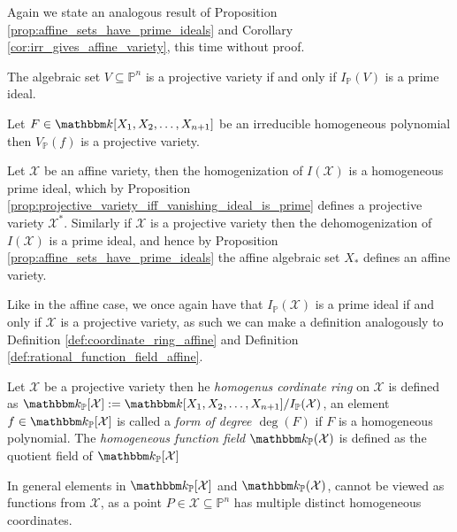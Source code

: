 Again we state an analogous result of Proposition \ref{prop:affine_sets_have_prime_ideals} and Corollary \ref{cor:irr_gives_affine_variety}, this time without proof.
\begin{proposition}\label{prop:projective_variety_iff_vanishing_ideal_is_prime}
The algebraic set $V \subseteq \mathbb{P}^{n}$ is a projective variety if and only if $I_{\mathbb{P}}(V)$ is a prime ideal.
\end{proposition}
\begin{corollary}\label{cor:irr_gives_projective_variety}
  Let $F \in \K[X_1, X_2, \ldots, X_{n + 1}]$ be an irreducible homogeneous polynomial then $V_{\mathbb{P}}(f)$ is a projective variety.
\end{corollary}


Let $\mathcal{X}$ be an affine variety, then the homogenization of $I(\mathcal{X})$ is a homogeneous prime ideal, which by Proposition \ref{prop:projective_variety_iff_vanishing_ideal_is_prime} defines a projective variety $\mathcal{X}^{*}$. Similarly if $\mathcal{X}$ is a projective variety then the dehomogenization of $I(\mathcal{X})$ is a prime ideal, and hence by Proposition \ref{prop:affine_sets_have_prime_ideals} the affine algebraic set $X_{*}$ defines an affine variety.

Like in the affine case, we once again have that $I_{\mathbb{P}}(\mathcal{X})$ is a prime ideal if and only if $\mathcal{X}$ is a projective variety, as such we can make a definition analogously to Definition  \ref{def:coordinate_ring_affine} and Definition \ref{def:rational_function_field_affine}.
\begin{definition}
  Let $\mathcal{X}$ be a projective variety then he \textit{homogenus cordinate ring} on $\mathcal{X}$ is defined as $\K_{\mathbb{P}}[\mathcal{X}] := \K[X_1, X_2, \ldots, X_{n+1}] / I_{\mathbb{P}}(\mathcal{X})$, an element $f \in \K_{\mathbb{P}}[\mathcal{X}]$ is called a \textit{form of degree $\deg(F)$} if $F$ is a homogeneous polynomial. The \textit{homogeneous function field} $\K_{\mathbb{P}}(\mathcal{X})$ is defined as the quotient field of $\K_{\mathbb{P}}[\mathcal{X}]$
\end{definition}
\begin{remark}
  In general elements in $\K_{\mathbb{P}}[\mathcal{X}]$ and $\K_{\mathbb{P}}(\mathcal{X})$, cannot be viewed as functions from $\mathcal{X}$, as a point $P \in \mathcal{X} \subseteq \mathbb{P}^{n}$ has multiple distinct homogeneous coordinates.
\end{remark}

